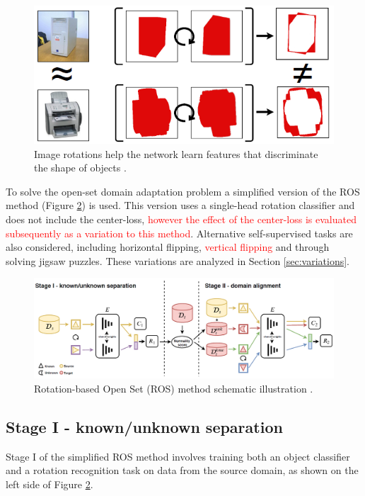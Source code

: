 \documentclass[10pt,twocolumn,letterpaper]{article}
\begin{document}
\begin{figure}[!htb]
  \centering
   \includegraphics[width=0.9\linewidth]{Figures/RotationFeatures.png}
   \caption{Image rotations help the network learn features that discriminate the shape of objects \cite{Bucci2020}.}
   \label{fig:RotationFeatures}
\end{figure}

To solve the open-set domain adaptation problem a simplified version of the ROS method (Figure \ref{fig:ROS}) is used. This version uses a single-head rotation classifier and does not include the center-loss, \textcolor{red}{however the effect of the center-loss is evaluated subsequently as a variation to this method}. Alternative self-supervised tasks are also considered, including horizontal flipping, \textcolor{red}{vertical flipping} and through solving jigsaw puzzles. These variations are analyzed in Section \ref{sec:variations}.

\begin{figure}[!htb]
  \centering
   \includegraphics[width=0.9\linewidth]{Figures/ROS.png}
   \caption{Rotation-based Open Set (ROS) method schematic illustration \cite{Bucci2020}.}
   \label{fig:ROS}
\end{figure}

\subsection{Stage I - known/unknown separation}

Stage I of the simplified ROS method involves training both an object classifier and a rotation recognition task on data from the source domain, as shown on the left side of Figure \ref{fig:ROS}. 
\end{document}
